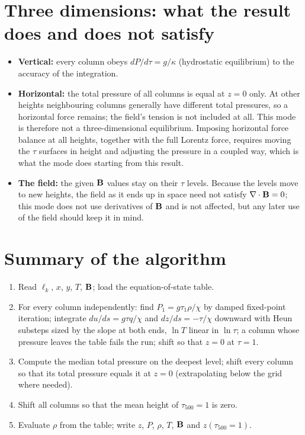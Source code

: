\section{Three dimensions: what the result does and does not satisfy}
\begin{itemize}
\item \textbf{Vertical:} every column obeys $dP/d\tau=g/\kappa$ (hydrostatic equilibrium) to the accuracy of the integration.
\item \textbf{Horizontal:} the total pressure of all columns is equal at $z=0$ only. At other heights neighbouring columns
generally have different total pressures, so a horizontal force remains; the field's tension is not included at all. This
mode is therefore not a three-dimensional equilibrium. Imposing horizontal force balance at all heights, together with the
full Lorentz force, requires moving the $\tau$ surfaces in height and adjusting the pressure in a coupled way, which is what
the mode  does starting from this result.
\item \textbf{The field:} the given $\mathbf B$ values stay on their $\tau$ levels. Because the levels move to new heights, the field
as it ends up in space need not satisfy $\nabla\cdot\mathbf B=0$; this mode does not use derivatives of $\mathbf B$ and is not affected,
but any later use of the field should keep it in mind.
\end{itemize}

\adjointcolumntrue


\section{Summary of the algorithm}
\begin{enumerate}
\item Read $\ell_k$, $x$, $y$, $T$, $\mathbf B$; load the equation-of-state table.
\item For every column independently: find $P_1=g\tau_1\rho/\chi$ by damped fixed-point iteration; integrate $du/ds=g\tau
q/\chi$ and $dz/ds=-\tau/\chi$ downward with Heun substeps sized by the slope at both ends, $\ln T$ linear in $\ln\tau$; a column
whose pressure leaves the table fails the run; shift so that $z=0$ at $\tau=1$.
\item Compute the median total pressure on the deepest level; shift every column so that its total pressure equals it at
$z=0$ (extrapolating below the grid where needed).
\item Shift all columns so that the mean height of $\tau_{500}=1$ is zero.
\item Evaluate $\rho$ from the table; write $z$, $P$, $\rho$, $T$, $\mathbf B$ and $z(\tau_{500}=1)$.
\end{enumerate}

